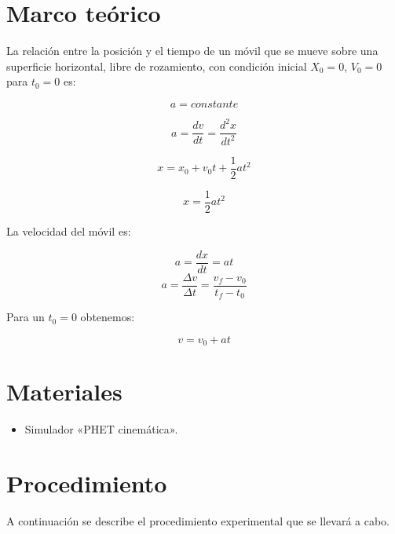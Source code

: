 \documentclass[letter,11pt]{article}
\begin{document}
\section{Marco teórico}
La relación entre la posición y el tiempo de un móvil que se mueve sobre una
superficie horizontal, libre de rozamiento, con condición inicial $X_0=0$,
$V_0 = 0$ para $t_0=0$ es:

\begin{equation*}
    a = constante
\end{equation*}

\begin{equation*}
    a = \frac{dv}{dt}=\frac{d^2 x}{dt^2}
\end{equation*}

\begin{equation*}
    x = x_0 + v_0 t + \frac{1}{2} a t^2
\end{equation*}

\begin{equation}
    x = \frac{1}{2} a t^2
\end{equation}

La velocidad del móvil es:

\begin{equation*}
    a = \frac{dx}{dt}=a t
\end{equation*}
\begin{equation*}
    a = \frac{\Delta v}{\Delta t}=\frac{v_f-v_0}{t_f-t_0}
\end{equation*}

Para un $t_0=0$ obtenemos:

\begin{equation}
    v = v_0 + at
\end{equation}

\section{Materiales}
\begin{itemize}
\item Simulador «PHET cinemática».
\end{itemize}

\section{Procedimiento}
A continuación se describe el procedimiento experimental que se llevará a
cabo.
\end{document}
